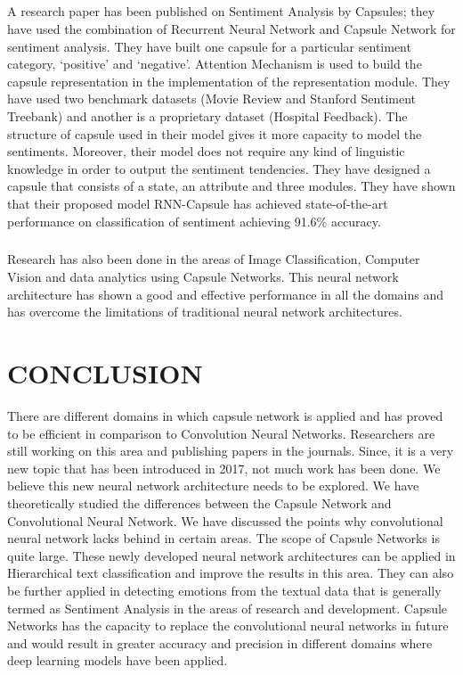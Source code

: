 \documentclass[a4paper,12pt]{report}
\begin{document}
\paragraph{}
A research paper has been published on Sentiment Analysis by Capsules; they have used the combination of Recurrent Neural Network and Capsule Network for sentiment analysis. They have built one capsule for a particular sentiment category, ‘positive’ and ‘negative’. Attention Mechanism is used to build the capsule representation in the implementation of the representation module. They have used two benchmark datasets (Movie Review and Stanford Sentiment Treebank) and another is a proprietary dataset (Hospital Feedback). The structure of capsule used in their model gives it more capacity to model the sentiments. Moreover, their model does not require any kind of linguistic knowledge in order to output the sentiment tendencies. They have designed a capsule that consists of a state, an attribute and three modules. They have shown that their proposed model RNN-Capsule has achieved state-of-the-art performance on classification of sentiment achieving 91.6\% accuracy. \cite{Y}

\paragraph{}
Research has also been done in the areas of Image Classification, Computer Vision and data analytics using Capsule Networks. This neural network architecture has shown a good and effective performance in all the domains and has overcome the limitations of traditional neural network architectures. \cite{Ivan, Duarte}

\newpage
\renewcommand\chaptername{CHAPTER}
\chapter{CONCLUSION}
There are different domains in which capsule network is applied and has proved to be efficient in comparison to Convolution Neural Networks. Researchers are still working on this area and publishing papers in the journals. Since, it is a very new topic that has been introduced in 2017, not much work has been done. We believe this new neural network architecture needs to be explored. We have theoretically studied the differences between the Capsule Network and Convolutional Neural Network. We have discussed the points why convolutional neural network lacks behind in certain areas. The scope of Capsule Networks is quite large. These newly developed neural network architectures can be applied in Hierarchical text classification and improve the results in this area. They can also be further applied in detecting emotions from the textual data that is generally termed as Sentiment Analysis in the areas of research and development. Capsule Networks has the capacity to replace the convolutional neural networks in future and would result in greater accuracy and precision in different domains where deep learning models have been applied.
\end{document}
